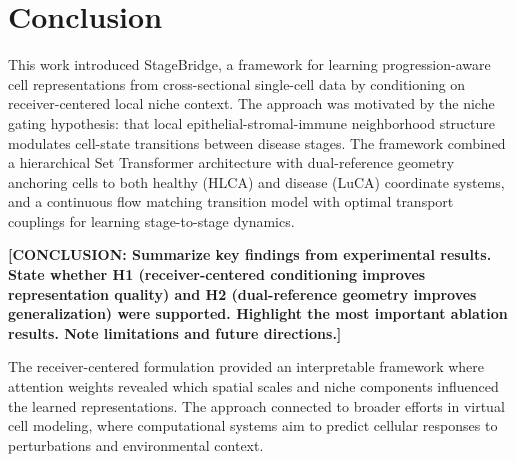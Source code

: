 \documentclass[11pt]{article}
\begin{document}
\section{Conclusion}

This work introduced StageBridge, a framework for learning progression-aware cell representations from cross-sectional single-cell data by conditioning on receiver-centered local niche context. The approach was motivated by the niche gating hypothesis: that local epithelial-stromal-immune neighborhood structure modulates cell-state transitions between disease stages. The framework combined a hierarchical Set Transformer architecture with dual-reference geometry anchoring cells to both healthy (HLCA) and disease (LuCA) coordinate systems, and a continuous flow matching transition model with optimal transport couplings for learning stage-to-stage dynamics.

\textbf{[CONCLUSION: Summarize key findings from experimental results. State whether H1 (receiver-centered conditioning improves representation quality) and H2 (dual-reference geometry improves generalization) were supported. Highlight the most important ablation results. Note limitations and future directions.]}

The receiver-centered formulation provided an interpretable framework where attention weights revealed which spatial scales and niche components influenced the learned representations. The approach connected to broader efforts in virtual cell modeling, where computational systems aim to predict cellular responses to perturbations and environmental context.




\end{document}
